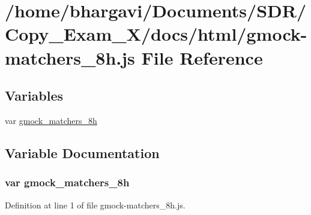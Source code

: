 \hypertarget{gmock-matchers__8h_8js}{}\section{/home/bhargavi/\+Documents/\+S\+D\+R/\+Copy\+\_\+\+Exam\+\_\+X/docs/html/gmock-\/matchers\+\_\+8h.js File Reference}
\label{gmock-matchers__8h_8js}
\subsection*{Variables}
\begin{DoxyCompactItemize}
\item 
var \hyperlink{gmock-matchers__8h_8js_af7cc1633e0d98ae1a353ff7e2559016d}{gmock\+\_\+matchers\+\_\+8h}
\end{DoxyCompactItemize}


\subsection{Variable Documentation}
\subsubsection[{\texorpdfstring{gmock\+\_\+matchers\+\_\+8h}{gmock_matchers_8h}}]{\setlength{\rightskip}{0pt plus 5cm}var gmock\+\_\+matchers\+\_\+8h}\hypertarget{gmock-matchers__8h_8js_af7cc1633e0d98ae1a353ff7e2559016d}{}\label{gmock-matchers__8h_8js_af7cc1633e0d98ae1a353ff7e2559016d}


Definition at line 1 of file gmock-\/matchers\+\_\+8h.\+js.

